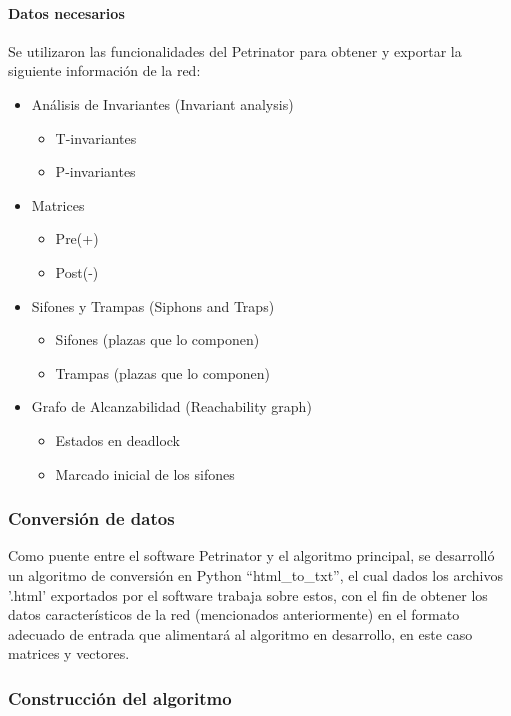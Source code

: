 \paragraph{Datos necesarios}
Se utilizaron las funcionalidades del Petrinator para obtener y exportar la siguiente información de la red:
\begin{itemize}
    \item Análisis de Invariantes (Invariant analysis)
    \begin{itemize}
        \item T-invariantes
        \item P-invariantes
    \end{itemize}
    \item Matrices
    \begin{itemize}
        \item Pre(+)
        \item Post(-)
    \end{itemize}
    \item Sifones y Trampas (Siphons and Traps)
    \begin{itemize}
        \item Sifones (plazas que lo componen)
        \item Trampas (plazas que lo componen)
    \end{itemize}
    \item Grafo de Alcanzabilidad (Reachability graph)
    \begin{itemize}
        \item Estados en deadlock
        \item Marcado inicial de los sifones
    \end{itemize}
\end{itemize}

\subsubsection{Conversión de datos}

Como puente entre el software Petrinator y el algoritmo principal, se desarrolló un algoritmo de conversión en Python “html\_to\_txt”, el cual dados los archivos '.html' exportados por el software trabaja sobre estos, con el fin de obtener los datos característicos de la red (mencionados anteriormente) en el formato adecuado de entrada que alimentará al algoritmo en desarrollo, en este caso matrices y vectores.

\subsubsection{Construcción del algoritmo}

